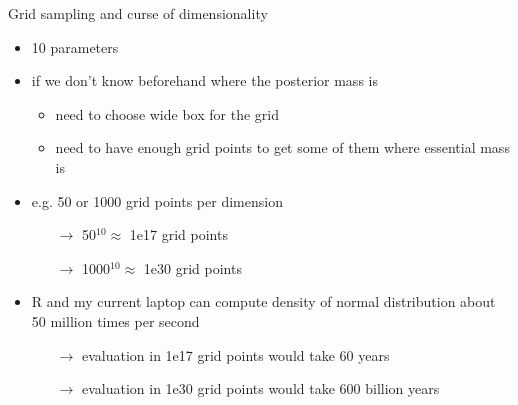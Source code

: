 \documentclass[finnish,english,t]{beamer}
\begin{document}
\begin{frame}{Grid sampling and curse of dimensionality}

  \begin{itemize}
      \item 10 parameters
      \item if we don't know beforehand where the posterior mass is
        \begin{itemize}
          \item need to choose wide box for the grid
          \item need to have enough grid points to get some of them
            where essential mass is
        \end{itemize}
      \item e.g. 50 or 1000 grid points per dimension
        \begin{itemize}
        \item[$\rightarrow$] 50$^{10} \approx$ 1e17 grid points
        \item[$\rightarrow$] 1000$^{10} \approx$ 1e30 grid points
        \end{itemize}
      \item R and my current laptop can compute density of normal
        distribution about 50 million times per second
        \begin{itemize}
        \item[$\rightarrow$] evaluation in 1e17 grid points would take
           60 years %
        \item[$\rightarrow$] evaluation in 1e30 grid points would take
           600 billion years %
        \end{itemize}
 \end{itemize}

\end{frame}
\end{document}

